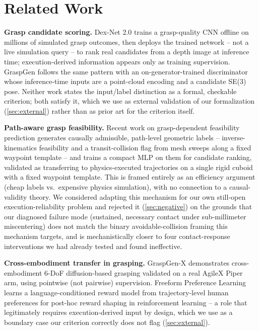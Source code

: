 \documentclass[journal]{IEEEtran}
\begin{document}
\section{Related Work}
\label{sec:related}

\textbf{Grasp candidate scoring.} Dex-Net 2.0 \cite{mahler2017dexnet}
trains a grasp-quality CNN offline on millions of simulated grasp
outcomes, then deploys the trained network -- not a live simulation query
-- to rank real candidates from a depth image at inference time;
execution-derived information appears only as training supervision.
GraspGen \cite{graspgen2025} follows the same pattern with an
on-generator-trained discriminator whose inference-time inputs are a
point-cloud encoding and a candidate SE(3) pose. Neither work states the
input/label distinction as a formal, checkable criterion; both satisfy it,
which we use as external validation of our formalization
(\cref{sec:external}) rather than as prior art for the criterion itself.

\textbf{Path-aware grasp feasibility.} Recent work on grasp-dependent
feasibility prediction \cite{feasibility2025} generates causally
admissible, path-level geometric labels -- inverse-kinematics feasibility
and a transit-collision flag from mesh sweeps along a fixed waypoint
template -- and trains a compact MLP on them for candidate ranking,
validated as transferring to physics-executed trajectories on a single
rigid cuboid with a fixed waypoint template. This is framed entirely as an
efficiency argument (cheap labels vs.\ expensive physics simulation), with
no connection to a causal-validity theory. We considered adapting this
mechanism for our own still-open execution-reliability problem and
rejected it (\cref{sec:negative}) on the grounds that our diagnosed
failure mode (sustained, necessary contact under sub-millimeter
miscentering) does not match the binary avoidable-collision framing this
mechanism targets, and is mechanistically closer to four contact-response
interventions we had already tested and found ineffective.

\textbf{Cross-embodiment transfer in grasping.} GraspGen-X
\cite{graspgenx2026} demonstrates cross-embodiment 6-DoF diffusion-based
grasping validated on a real AgileX Piper arm, using pointwise (not
pairwise) supervision. Freeform Preference Learning \cite{fpl2026} learns
a language-conditioned reward model from trajectory-level human
preferences for post-hoc reward shaping in reinforcement learning -- a
role that legitimately requires execution-derived input by design, which
we use as a boundary case our criterion correctly does not flag
(\cref{sec:external}).
\end{document}
